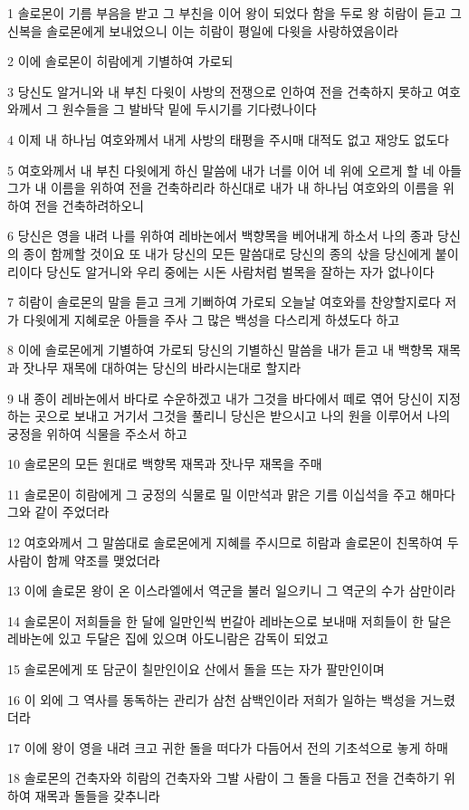 \par 1 솔로몬이 기름 부음을 받고 그 부친을 이어 왕이 되었다 함을 두로 왕 히람이 듣고 그 신복을 솔로몬에게 보내었으니 이는 히람이 평일에 다윗을 사랑하였음이라
\par 2 이에 솔로몬이 히람에게 기별하여 가로되
\par 3 당신도 알거니와 내 부친 다윗이 사방의 전쟁으로 인하여 전을 건축하지 못하고 여호와께서 그 원수들을 그 발바닥 밑에 두시기를 기다렸나이다
\par 4 이제 내 하나님 여호와께서 내게 사방의 태평을 주시매 대적도 없고 재앙도 없도다
\par 5 여호와께서 내 부친 다윗에게 하신 말씀에 내가 너를 이어 네 위에 오르게 할 네 아들 그가 내 이름을 위하여 전을 건축하리라 하신대로 내가 내 하나님 여호와의 이름을 위하여 전을 건축하려하오니
\par 6 당신은 영을 내려 나를 위하여 레바논에서 백향목을 베어내게 하소서 나의 종과 당신의 종이 함께할 것이요 또 내가 당신의 모든 말씀대로 당신의 종의 삯을 당신에게 붙이리이다 당신도 알거니와 우리 중에는 시돈 사람처럼 벌목을 잘하는 자가 없나이다
\par 7 히람이 솔로몬의 말을 듣고 크게 기뻐하여 가로되 오늘날 여호와를 찬양할지로다 저가 다윗에게 지혜로운 아들을 주사 그 많은 백성을 다스리게 하셨도다 하고
\par 8 이에 솔로몬에게 기별하여 가로되 당신의 기별하신 말씀을 내가 듣고 내 백향목 재목과 잣나무 재목에 대하여는 당신의 바라시는대로 할지라
\par 9 내 종이 레바논에서 바다로 수운하겠고 내가 그것을 바다에서 떼로 엮어 당신이 지정하는 곳으로 보내고 거기서 그것을 풀리니 당신은 받으시고 나의 원을 이루어서 나의 궁정을 위하여 식물을 주소서 하고
\par 10 솔로몬의 모든 원대로 백향목 재목과 잣나무 재목을 주매
\par 11 솔로몬이 히람에게 그 궁정의 식물로 밀 이만석과 맑은 기름 이십석을 주고 해마다 그와 같이 주었더라
\par 12 여호와께서 그 말씀대로 솔로몬에게 지혜를 주시므로 히람과 솔로몬이 친목하여 두 사람이 함께 약조를 맺었더라
\par 13 이에 솔로몬 왕이 온 이스라엘에서 역군을 불러 일으키니 그 역군의 수가 삼만이라
\par 14 솔로몬이 저희들을 한 달에 일만인씩 번갈아 레바논으로 보내매 저희들이 한 달은 레바논에 있고 두달은 집에 있으며 아도니람은 감독이 되었고
\par 15 솔로몬에게 또 담군이 칠만인이요 산에서 돌을 뜨는 자가 팔만인이며
\par 16 이 외에 그 역사를 동독하는 관리가 삼천 삼백인이라 저희가 일하는 백성을 거느렸더라
\par 17 이에 왕이 영을 내려 크고 귀한 돌을 떠다가 다듬어서 전의 기초석으로 놓게 하매
\par 18 솔로몬의 건축자와 히람의 건축자와 그발 사람이 그 돌을 다듬고 전을 건축하기 위하여 재목과 돌들을 갖추니라

